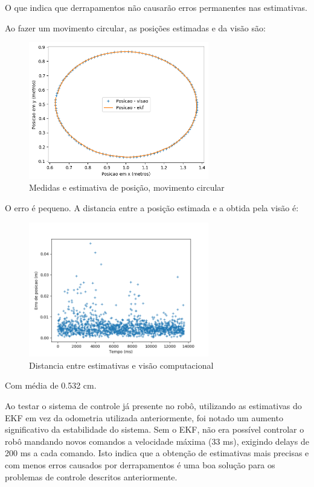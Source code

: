 \documentclass[
	12pt,				%
	openright,			%
	twoside,			%
	convert,
	a4paper,			%
	english,			%
	french,				%
	spanish,			%
	brazil				%
	]{abntex2}
\begin{document}
\par
O que indica que derrapamentos não causarão erros permanentes nas estimativas.
\par
Ao fazer um movimento circular, as posições estimadas e da visão são:
\begin{figure}[H]
	\caption{Medidas e estimativa de posição, movimento circular}
\begin{center}
   \includegraphics[width=0.7\textwidth]{ekf_circular}
\end{center}
\end{figure}
O erro é pequeno. A distancia entre a posição estimada e a obtida pela visão é:
\begin{figure}[H]
	\caption{Distancia entre estimativas e visão computacional}
\begin{center}
	\includegraphics[width=0.7\textwidth]{ekf_circular_erro2}
\end{center}
\end{figure}
\par
Com média de 0.532 cm.
\par
Ao testar o sistema de controle já presente no robô, utilizando as estimativas do EKF em vez da odometria utilizada anteriormente, foi notado um aumento significativo da estabilidade do sistema. Sem o EKF, não era possível controlar o robô mandando novos comandos a velocidade máxima (33 ms), exigindo delays de 200 ms a cada comando. Isto indica que a obtenção de estimativas mais precisas e com menos erros causados por derrapamentos é uma boa solução para os problemas de controle descritos anteriormente.
\end{document}
